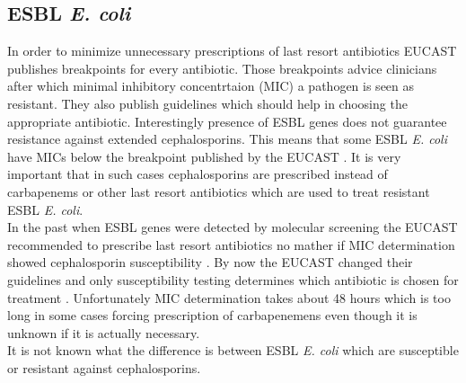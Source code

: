 \subsection{ESBL \textit{E. coli}}
In order to minimize unnecessary prescriptions of last resort antibiotics EUCAST publishes breakpoints for every antibiotic. Those breakpoints advice clinicians after which minimal inhibitory concentrtaion (MIC) a pathogen is seen as resistant. They also publish guidelines which should help in choosing the appropriate antibiotic. Interestingly presence of ESBL genes does not guarantee resistance against extended cephalosporins. This means that some ESBL \textit{E. coli} have MICs below the breakpoint published by the EUCAST \cite{tissot_enterobacteriaceae_nodate}. It is very important that in such cases cephalosporins are prescribed instead of carbapenems or other last resort antibiotics which are used to treat resistant ESBL \textit{E. coli}. \\
In the past when ESBL genes were detected by molecular screening the EUCAST recommended to prescribe last resort antibiotics no mather if MIC determination showed cephalosporin susceptibility \cite{leclercq_eucast_2013}. By now the EUCAST changed their guidelines and only susceptibility testing determines which antibiotic is chosen for treatment \cite{leclercq_eucast_2013}. Unfortunately MIC determination takes about 48 hours which is too long in some cases forcing prescription of carbapenemens even though it is unknown if it is actually necessary.\\
It is not known what the difference is between ESBL \textit{E. coli} which are susceptible or resistant against cephalosporins.   

